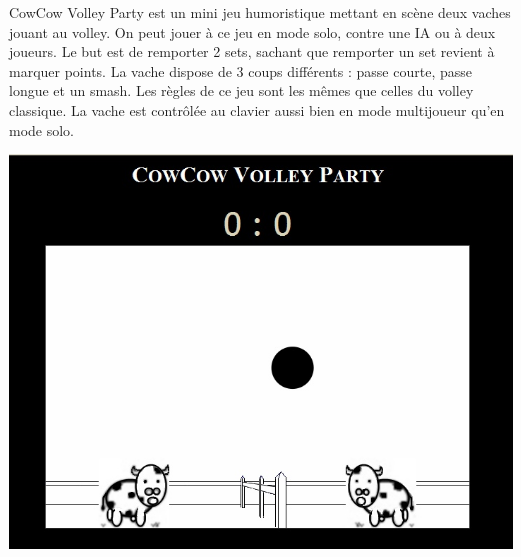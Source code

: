 \begin{minipage}{9cm}
CowCow Volley Party est un mini jeu humoristique mettant en scène deux vaches jouant au volley.
On peut jouer à ce jeu en mode solo, contre une IA ou à deux joueurs. 
Le but est de remporter 2 sets, sachant que remporter un set revient à marquer  points. 
La vache dispose de 3 coups différents : passe courte, passe longue et un smash.
Les règles de ce jeu sont les mêmes que celles du volley classique.
La vache est contrôlée au clavier aussi bien en mode multijoueur qu’en mode solo.
\end{minipage}
\hfill
\begin{minipage}{6cm}
 \includegraphics[width=\linewidth]{img/capturejeu_volleycowcow}
\end{minipage}

